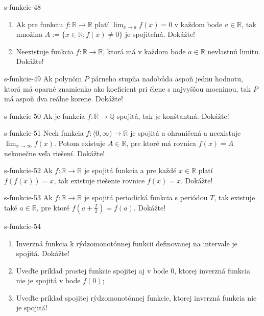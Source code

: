 	\begin{defproblem}{s-funkcie-48}
	\begin{enumerate}
	\item Ak pre funkciu $f: \mathbb{R} \rightarrow \mathbb{R}$ platí $\lim_{x \rightarrow a}f(x)=0$ v každom bode $a \in \mathbb{R}$, tak množina $A:=\{x \in \mathbb{R};f(x)\neq 0\}$ je spojiteľná. Dokážte!
	\item Neexistuje funkcia $f: \mathbb{R} \rightarrow \mathbb{R}$, ktorá má v každom bode $a \in \mathbb{R}$ nevlastnú limitu. Dokážte!
	\end{enumerate}
	\end{defproblem}
	
	\begin{defproblem}{s-funkcie-49}
	Ak polynóm $P$ párneho stupňa nadobúda aspoň jednu hodnotu, ktorá má oparné znamienko ako koeficient pri člene s najvyššou mocninou, tak $P$ má aspoň dva reálne korene. Dokážte!
	\end{defproblem}
	
	\begin{defproblem}{s-funkcie-50}
	Ak je funkcia $f: \mathbb{R} \rightarrow \mathbb{Q}$ spojitá, tak je konštantná. Dokážte!
	\end{defproblem}
	
	\begin{defproblem}{s-funkcie-51}
	Nech funkcia $f: \langle 0, \infty) \rightarrow \mathbb{R}$ je spojitá a ohraničená a neexistuje $\lim_{x \rightarrow \infty}f(x)$. Potom existuje $A \in \mathbb{R}$, pre ktoré má rovnica $f(x)=A$ nekonečne veľa riešení. Dokážte!
	\end{defproblem}
	
	\begin{defproblem}{s-funkcie-52}
	Ak $f: \mathbb{R} \rightarrow \mathbb{R}$ je spojitá funkcia a pre každé $x \in \mathbb{R}$ platí $f(f(x))=x$, tak existuje riešenie rovnice $f(x)=x$. Dokážte!
	\end{defproblem}
	
	\begin{defproblem}{s-funkcie-53}
	Ak $f: \mathbb{R} \rightarrow \mathbb{R}$ je spojitá periodická funkcia s periódou $T$, tak existuje také $a \in \mathbb{R}$, pre ktoré $f(a+\frac{T}{2})=f(a)$. Dokážte!
	\end{defproblem}
	
	\begin{defproblem}{s-funkcie-54}
	\begin{enumerate}
	\item Inverzná funkcia k rýdzomonotónnej funkcii definovanej na intervale je spojitá. Dokážte!
	\item Uveďte príklad prostej funkcie spojitej aj v bode $0$, ktorej inverzná funkcia nie je spojitá v bode $f(0)$;
	\item Uveďte príklad spojitej rýdzomonotónnej funkcie, ktorej inverzná funkcia nie je spojitá!
	\end{enumerate}
	\end{defproblem}
	
